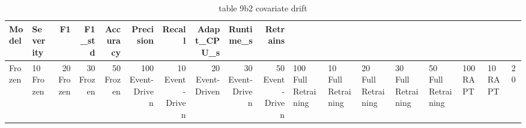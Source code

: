 \begin{table}
\caption{table 9b2 covariate drift}
\label{tab:table_9b2_covariate_drift}
\begin{tabular}{llrrrrrrrr}
\toprule
Model & Severity & F1 & F1_std & Accuracy & Precision & Recall & Adapt_CPU_s & Runtime_s & Retrains \\
\midrule
Frozen & 10%
Frozen & 20%
Frozen & 30%
Frozen & 50%
Frozen & 100%
Event-Driven & 10%
Event-Driven & 20%
Event-Driven & 30%
Event-Driven & 50%
Event-Driven & 100%
Full Retraining & 10%
Full Retraining & 20%
Full Retraining & 30%
Full Retraining & 50%
Full Retraining & 100%
RAPT & 10%
RAPT & 20%

\end{tabular}
\end{table}
